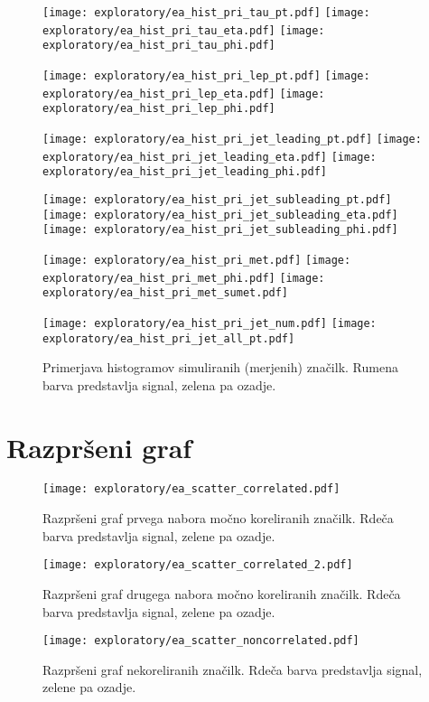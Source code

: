 \begin{figure}[ht!]
	\label{hist_prim}

	\texttt{[image: exploratory/ea\_hist\_pri\_tau\_pt.pdf]}	
	\texttt{[image: exploratory/ea\_hist\_pri\_tau\_eta.pdf]}	
	\texttt{[image: exploratory/ea\_hist\_pri\_tau\_phi.pdf]}	
	
	\texttt{[image: exploratory/ea\_hist\_pri\_lep\_pt.pdf]}	
	\texttt{[image: exploratory/ea\_hist\_pri\_lep\_eta.pdf]}	
	\texttt{[image: exploratory/ea\_hist\_pri\_lep\_phi.pdf]}	
	
	\texttt{[image: exploratory/ea\_hist\_pri\_jet\_leading\_pt.pdf]}	
	\texttt{[image: exploratory/ea\_hist\_pri\_jet\_leading\_eta.pdf]}	
	\texttt{[image: exploratory/ea\_hist\_pri\_jet\_leading\_phi.pdf]}	
	
	\texttt{[image: exploratory/ea\_hist\_pri\_jet\_subleading\_pt.pdf]}	
	\texttt{[image: exploratory/ea\_hist\_pri\_jet\_subleading\_eta.pdf]}	
	\texttt{[image: exploratory/ea\_hist\_pri\_jet\_subleading\_phi.pdf]}
	
	
	\texttt{[image: exploratory/ea\_hist\_pri\_met.pdf]}	
	\texttt{[image: exploratory/ea\_hist\_pri\_met\_phi.pdf]}	
	\texttt{[image: exploratory/ea\_hist\_pri\_met\_sumet.pdf]}	
	
	\texttt{[image: exploratory/ea\_hist\_pri\_jet\_num.pdf]}	
	\texttt{[image: exploratory/ea\_hist\_pri\_jet\_all\_pt.pdf]}	

	\caption{Primerjava histogramov simuliranih (merjenih) značilk. Rumena barva predstavlja signal, zelena pa ozadje.}	
	\label{sl:histogram_izmerjene}		
	
\end{figure}

\clearpage

\section{Razpršeni graf}

\new\begin{figure}[ht]
	\texttt{[image: exploratory/ea\_scatter\_correlated.pdf]}	
	\caption{Razpršeni graf prvega nabora močno koreliranih značilk. Rdeča barva predstavlja signal, zelene pa ozadje.}
	\label{sl:scatter_corr}
\end{figure}

\begin{figure}[ht]	
	\texttt{[image: exploratory/ea\_scatter\_correlated\_2.pdf]}	
	\caption{Razpršeni graf drugega nabora močno koreliranih značilk. Rdeča barva predstavlja signal, zelene pa ozadje.}
	\label{sl:scatter_corr2}
\end{figure}

\begin{figure}[ht]
	\texttt{[image: exploratory/ea\_scatter\_noncorrelated.pdf]}	
	\caption{Razpršeni graf nekoreliranih značilk. Rdeča barva predstavlja signal, zelene pa ozadje.}
	\label{sl:scatter_noncorr}			
\end{figure}




